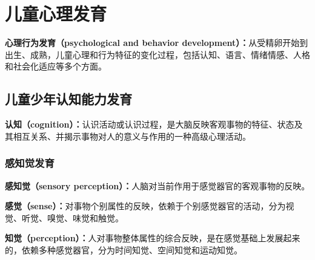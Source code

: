 \chapter{儿童心理发育}
\setcounter{chapter}{5}

\begin{defbox}
\textbf{心理行为发育（psychological and behavior development）：}从受精卵开始到出生、成熟，儿童心理和行为特征的变化过程，包括认知、语言、情绪情感、人格和社会化适应等多个方面。
\end{defbox}

\section{儿童少年认知能力发育}

\begin{defbox}
\textbf{认知（cognition）：}认识活动或认识过程，是大脑反映客观事物的特征、状态及其相互关系、并揭示事物对人的意义与作用的一种高级心理活动。
\end{defbox}

\subsection{感知觉发育}

\begin{defbox}
\textbf{感知觉（sensory perception）：}人脑对当前作用于感觉器官的客观事物的反映。

\textbf{感觉（sense）：}对事物个别属性的反映，依赖于个别感觉器官的活动，分为视觉、听觉、嗅觉、味觉和触觉。

\textbf{知觉（perception）：}人对事物整体属性的综合反映，是在感觉基础上发展起来的，依赖多种感觉器官，分为时间知觉、空间知觉和运动知觉。
\end{defbox}

